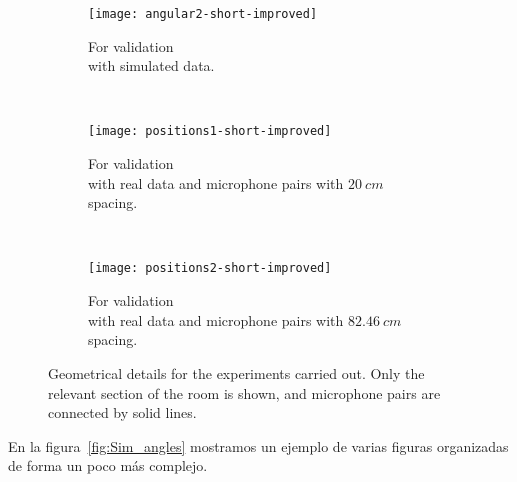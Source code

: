 \begin{figure}
  \centering
  \begin{subfigure}[t]{0.3\textwidth}
    \texttt{[image: angular2-short-improved]}
    \caption{For validation\\with simulated data.}
    \label{fig:Simulated_positions}
  \end{subfigure}
~%
  \begin{subfigure}[t]{0.3\textwidth}
    \texttt{[image: positions1-short-improved]}
    \caption{For validation\\with real data and microphone pairs with $20~cm$ spacing.}
    \label{fig:real_positions_short}
  \end{subfigure}
  ~
  \begin{subfigure}[t]{0.3\textwidth}
    \texttt{[image: positions2-short-improved]}
    \caption{For validation\\with real data and microphone pairs with
      $82.46~cm$ spacing.}
    \label{fig:real_positions_long}
  \end{subfigure}
  \caption{Geometrical details for the experiments carried out. Only the
    relevant section of the room is shown, and microphone pairs are
    connected by solid lines.}
  \label{fig:simureal_positions}
\end{figure}

En la figura~\ref{fig:Sim_angles} mostramos un ejemplo de varias
figuras organizadas de forma un poco más complejo.

